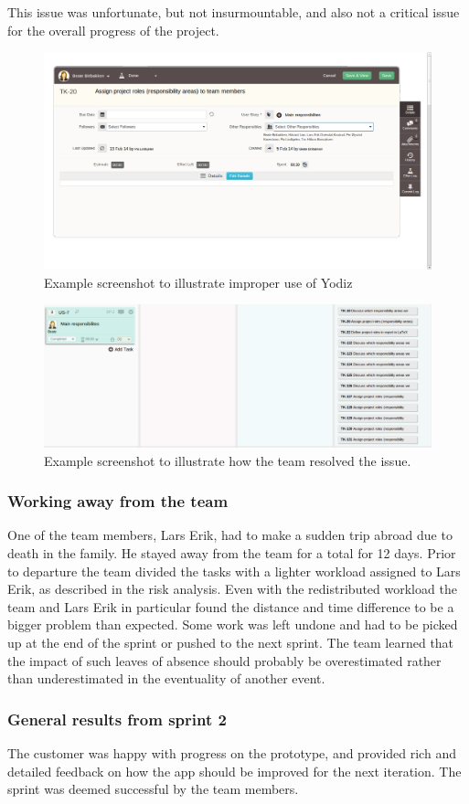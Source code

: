 This issue was unfortunate, but not insurmountable, and also not a critical
issue for the overall progress of the project.

\begin{figure}[H]
\includegraphics[width=\textwidth]{ch/sprints/fig/wrongUse.png}
\caption{Example screenshot to illustrate improper use of Yodiz}
\label{fig:wrongUse}
\end{figure}

\begin{figure}[H]
\includegraphics[width=\textwidth]{ch/sprints/fig/addsTasks.png}
\caption{Example screenshot to illustrate how the team resolved the issue.}
\label{fig:addsTasks}
\end{figure}

\subsubsection{Working away from the team}
One of the team members, Lars Erik, had to make a sudden trip abroad due to
death in the family. He stayed away from the team for a total for 12 days. Prior
to departure the team divided the tasks with a lighter workload assigned to Lars
Erik, as described in the risk analysis. Even with the redistributed workload
the team and Lars Erik in particular found the distance and time difference to
be a bigger problem than expected. Some work was left undone and had to be
picked up at the end of the sprint or pushed to the next sprint. The team
learned that the impact of such leaves of absence should probably be
overestimated rather than underestimated in the eventuality of another event.

\subsubsection{General results from sprint 2} The customer was happy with
progress on the prototype, and provided rich and detailed feedback on how the
app should be improved for the next iteration. The sprint was deemed successful
by the team members.

